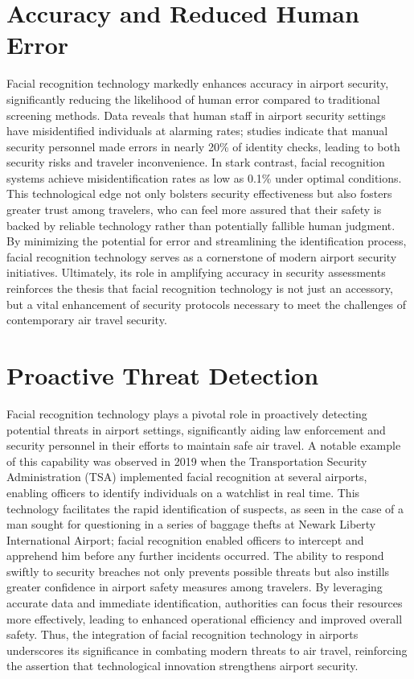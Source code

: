 \documentclass{article}%
\begin{document}
%
\section*{Accuracy and Reduced Human Error}%
\label{sec:AccuracyandReducedHumanError}%
Facial recognition technology markedly enhances accuracy in airport security, significantly reducing the likelihood of human error compared to traditional screening methods. Data reveals that human staff in airport security settings have misidentified individuals at alarming rates; studies indicate that manual security personnel made errors in nearly 20\% of identity checks, leading to both security risks and traveler inconvenience. In stark contrast, facial recognition systems achieve misidentification rates as low as 0.1\% under optimal conditions. This technological edge not only bolsters security effectiveness but also fosters greater trust among travelers, who can feel more assured that their safety is backed by reliable technology rather than potentially fallible human judgment. By minimizing the potential for error and streamlining the identification process, facial recognition technology serves as a cornerstone of modern airport security initiatives. Ultimately, its role in amplifying accuracy in security assessments reinforces the thesis that facial recognition technology is not just an accessory, but a vital enhancement of security protocols necessary to meet the challenges of contemporary air travel security.

%
\section*{Proactive Threat Detection}%
\label{sec:ProactiveThreatDetection}%
Facial recognition technology plays a pivotal role in proactively detecting potential threats in airport settings, significantly aiding law enforcement and security personnel in their efforts to maintain safe air travel. A notable example of this capability was observed in 2019 when the Transportation Security Administration (TSA) implemented facial recognition at several airports, enabling officers to identify individuals on a watchlist in real time. This technology facilitates the rapid identification of suspects, as seen in the case of a man sought for questioning in a series of baggage thefts at Newark Liberty International Airport; facial recognition enabled officers to intercept and apprehend him before any further incidents occurred. The ability to respond swiftly to security breaches not only prevents possible threats but also instills greater confidence in airport safety measures among travelers. By leveraging accurate data and immediate identification, authorities can focus their resources more effectively, leading to enhanced operational efficiency and improved overall safety. Thus, the integration of facial recognition technology in airports underscores its significance in combating modern threats to air travel, reinforcing the assertion that technological innovation strengthens airport security.
\end{document}
